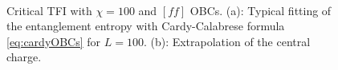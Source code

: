 	\begin{figure}[h!]
		\hspace{-0.9cm}
		\
		\caption{Critical TFI with $\chi=100$ and $[ff]$ OBCs. (a): Typical fitting of the entanglement entropy with Cardy-Calabrese formula \eqref{eq:cardyOBCs} for $L=100$. (b): Extrapolation of the central charge.}
		\label{fig:cTFI}
	\end{figure}

